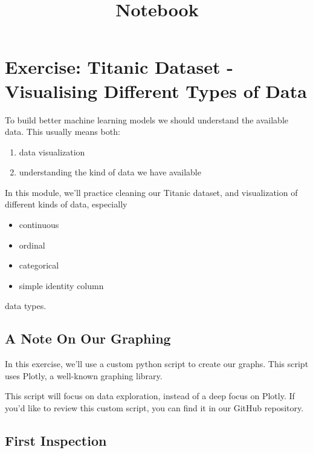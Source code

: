 \documentclass[11pt]{article}
\title{Notebook}
\providecommand{\tightlist}{%
      \setlength{\itemsep}{0pt}\setlength{\parskip}{0pt}}
\begin{document}
    
    \maketitle
    
    

    
    \hypertarget{exercise-titanic-dataset---visualising-different-types-of-data}{%
\section{Exercise: Titanic Dataset - Visualising Different Types of
Data}\label{exercise-titanic-dataset---visualising-different-types-of-data}}

To build better machine learning models we should understand the
available data. This usually means both:

\begin{enumerate}
\def\labelenumi{\arabic{enumi}.}
\item
  data visualization
\item
  understanding the kind of data we have available
\end{enumerate}

In this module, we'll practice cleaning our Titanic dataset, and
visualization of different kinds of data, especially

\begin{itemize}
\tightlist
\item
  continuous
\item
  ordinal
\item
  categorical
\item
  simple identity column
\end{itemize}

data types.

\hypertarget{a-note-on-our-graphing}{%
\subsection{A Note On Our Graphing}\label{a-note-on-our-graphing}}

In this exercise, we'll use a custom python script to create our graphs.
This script uses Plotly, a well-known graphing library.

This script will focus on data exploration, instead of a deep focus on
Plotly. If you'd like to review this custom script, you can find it in
our GitHub repository.

\hypertarget{first-inspection}{%
\subsection{First Inspection}\label{first-inspection}}
\end{document}
